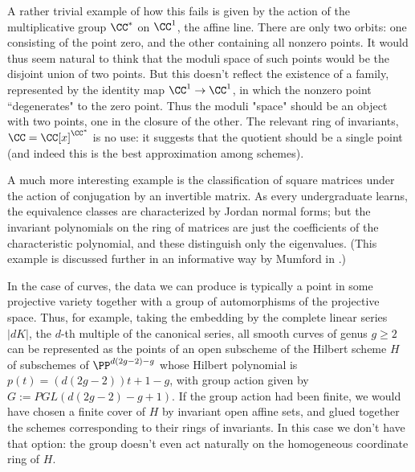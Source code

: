 A rather trivial example of how this fails is given by the action of the multiplicative group $\CC^*$ on $\CC^1$, the
affine line. There are only two orbits: one consisting of the point zero, and the other containing all nonzero points. It would thus seem natural to think that the moduli space of such points would be the disjoint union of two points. But this doesn't reflect the existence of a family, represented by the 
identity map $\CC^1 \to \CC^1$, in which the nonzero point ``degenerates" to the zero point. Thus the moduli "space" should be an object with two points, one in the closure of the other. The relevant ring of invariants, $\CC = \CC[x]^{\CC^*}$ is no use: it suggests that the quotient should be a single point (and indeed this is the best approximation among schemes).

A much more interesting example is the classification of square matrices under the action of conjugation by an invertible matrix. As every undergraduate learns, the equivalence classes are characterized by Jordan normal forms; but the invariant polynomials on the ring of matrices are just the coefficients of the characteristic polynomial, and these distinguish only the eigenvalues. (This example is discussed further in an informative way by Mumford in \cite{Mumford-Oslo}.)

In the case of curves, the data we can produce is typically a point in some projective variety together with a group of automorphisms of the projective space. Thus, for example, taking the embedding by the complete linear series $|dK|$, the $d$-th multiple of the canonical series, all smooth curves of genus $g\geq 2$ can be represented as the points of an open subscheme of the Hilbert scheme $H$ of subschemes of $\PP^{d(2g-2)-g}$ whose Hilbert polynomial is $p(t) = (d(2g-2))t+1-g$, with group action given by
$G := PGL(d(2g-2)-g+1)$. If the group action had been finite, we would have chosen a finite cover of $H$ by invariant open affine sets, and glued together the schemes corresponding to their rings of invariants. In this case we don't have that option: the group doesn't even act naturally on the homogeneous coordinate ring
of $H$. 

